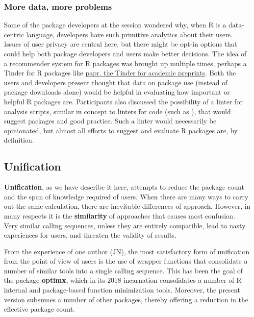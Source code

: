 \hypertarget{more-data-more-problems}{%
\subsubsection{More data, more problems}\label{more-data-more-problems}}

Some of the package developers at the session wondered why, when R is a
data-centric language, developers have such primitive analytics about
their users. Issues of user privacy are central here, but there might be
opt-in options that could help both package developers and users make
better decisions. The idea of a recommender system for R packages was
brought up multiple times, perhaps a Tinder for R packages like
\href{https://simplystatistics.org/2016/10/03/papr/}{papr, the Tinder
for academic preprints}. Both the users and developers present thought
that data on package use (instead of package downloads alone) would be
helpful in evaluating how important or helpful R packages are.
Participants also discussed the possibility of a linter for analysis
scripts, similar in concept to linters for code (such as \citet{lintr}),
that would suggest packages and good practice. Such a linter would
necessarily be opinionated, but almost all efforts to suggest and
evaluate R packages are, by definition.

\hypertarget{unification}{%
\subsection{Unification}\label{unification}}

\textbf{Unification}, as we have describe it here, attempts to reduce
the package count and the span of knowledge required of users. When
there are many ways to carry out the same calculation, there are
inevitable differences of approach. However, in many respects it is the
\textbf{similarity} of approaches that causes most confusion. Very
similar calling sequences, unless they are entirely compatible, lead to
nasty experiences for users, and threaten the validity of results.

From the experience of one author (JN), the most satisfactory form of
unification from the point of view of users is the use of wrapper
functions that consolidate a number of similar tools into a single
calling sequence. This has been the goal of the package \textbf{optimx},
which in its 2018 incarnation consolidates a number of R-internal and
package-based function minimization tools. Moreover, the present version
subsumes a number of other packages, thereby offering a reduction in the
effective package count.

